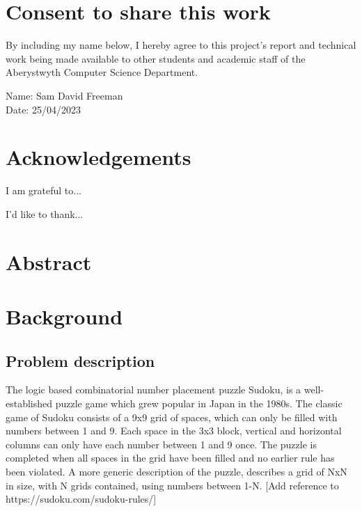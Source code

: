 \documentclass[a4paper,11pt]{article}
\begin{document}
\vspace{1em}
\section*{\centering Consent to share this work}

By including my name below, I hereby agree to this project's report and technical work being made available to other students and academic staff of the Aberystwyth Computer Science Department.  

\vspace{2em}
Name: Sam David Freeman  \\

\vspace{1em}
Date: 25/04/2023 \\
\newpage
\section*{\centering Acknowledgements}

I am grateful to...

I'd like to thank...
\newpage
\section*{\centering Abstract}

\newpage
\tableofcontents

\section{Background}
	
\subsection{Problem description}
The logic based combinatorial number placement puzzle Sudoku, is a well-established puzzle game which grew popular in Japan in the 1980s. The classic game of Sudoku consists of a 9x9 grid of spaces, which can only be filled with numbers between 1 and 9. Each space in the 3x3 block, vertical and horizontal columns can only have each number between 1 and 9 once. The puzzle is completed when all spaces in the grid have been filled and no earlier rule has been violated. A more generic description of the puzzle, describes a grid of NxN in size, with N grids contained, using numbers between 1-N. [Add reference to https://sudoku.com/sudoku-rules/]
\end{document}
